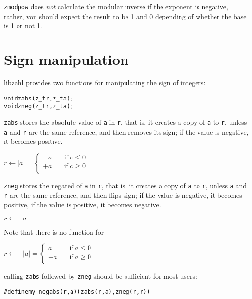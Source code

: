 {\tt zmodpow} does \emph{not} calculate the
modular inverse if the exponent is negative,
rather, you should expect the result to be
1 and 0 depending of whether the base is 1
or not 1.


\newpage
\section{Sign manipulation}
\label{sec:Sign manipulation}

libzahl provides two functions for manipulating
the sign of integers:

\begin{alltt}
   void zabs(z_t r, z_t a);
   void zneg(z_t r, z_t a);
\end{alltt}

{\tt zabs} stores the absolute value of {\tt a}
in {\tt r}, that is, it creates a copy of
{\tt a} to {\tt r}, unless {\tt a} and {\tt r}
are the same reference, and then removes its sign;
if the value is negative, it becomes positive.

\vspace{1em}
\(
    r \gets \lvert a \rvert =
    \left \lbrace \begin{array}{rl}
        -a & \quad \textrm{if}~a \le 0 \\
        +a & \quad \textrm{if}~a \ge 0 \\
    \end{array} \right .
\)
\vspace{1em}

{\tt zneg} stores the negated of {\tt a}
in {\tt r}, that is, it creates a copy of
{\tt a} to {\tt r}, unless {\tt a} and {\tt r}
are the same reference, and then flips sign;
if the value is negative, it becomes positive,
if the value is positive, it becomes negative.

\vspace{1em}
\(
    r \gets -a
\)
\vspace{1em}

Note that there is no function for

\vspace{1em}
\(
    r \gets -\lvert a \rvert =
    \left \lbrace \begin{array}{rl}
         a & \quad \textrm{if}~a \le 0 \\
        -a & \quad \textrm{if}~a \ge 0 \\
    \end{array} \right .
\)
\vspace{1em}

\noindent
calling {\tt zabs} followed by {\tt zneg}
should be sufficient for most users:

\begin{alltt}
   #define my_negabs(r, a)  (zabs(r, a), zneg(r, r))
\end{alltt}
